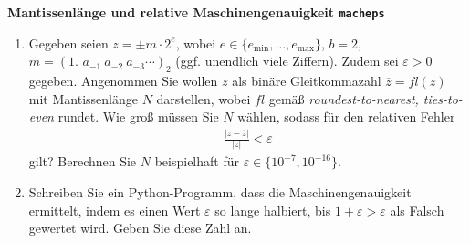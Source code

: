 \textbf{Mantissenlänge und relative Maschinengenauigkeit \texttt{macheps}}
\begin{enumerate}
	\item Gegeben seien $z = \pm m \cdot2^e$, wobei $e \in \lbrace e_{\text{min}}, \dots, e_{\text{max}}\rbrace$, $b=2$, $m = (1\textbf{. }a_{-1}~a_{-2}~a_{-3} \cdots)_2$ (ggf. unendlich viele Ziffern).
	Zudem sei $\varepsilon > 0$ gegeben. Angenommen Sie wollen $z$ als binäre Gleitkommazahl $\overline{z}=fl(z)$ mit Mantissenlänge $N$ darstellen, wobei $fl$ gemäß \textit{roundest-to-nearest, ties-to-even} rundet. Wie groß müssen Sie $N$ wählen, sodass für den relativen Fehler 
	\begin{align*}
	\frac{|z - \overline{z}|}{|z|} < \varepsilon
	\end{align*}
	gilt? Berechnen Sie $N$ beispielhaft für $\varepsilon\in\{10^{-7},10^{-16}\}$.
	
	\item Schreiben Sie ein Python-Programm, dass die Maschinengenauigkeit ermittelt, indem es einen Wert $\varepsilon$ so lange halbiert, bis
	$1 + \varepsilon > \varepsilon$ als Falsch gewertet wird. Geben Sie diese Zahl an.
\end{enumerate}